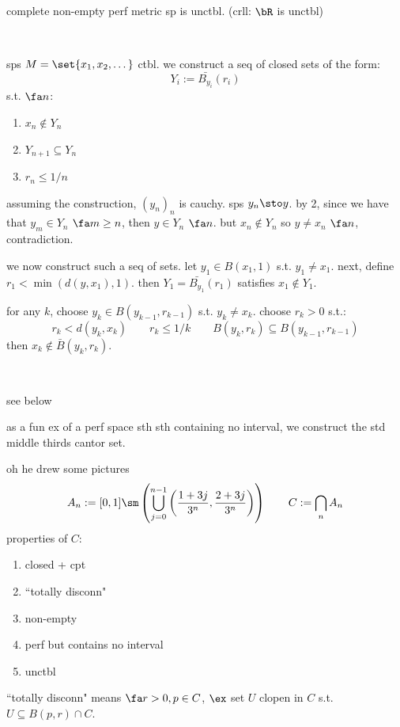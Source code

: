 \begin{thm}
    complete non-empty perf metric sp is unctbl.
	(crll: $\bR$ is unctbl)
\end{thm} \

\begin{pf}[source=Primary Source Material]
    sps $M=\set{x_{1},x_{2},\dots}$ ctbl.
	we construct a seq of closed sets of the form:
	\begin{equation*}
		Y_{i}:=\bar{B_{y_{i}}}(r_{i})
	\end{equation*}
	s.t. $\fa n$:
	\begin{enumerate}
	    \item $x_{n}\notin Y_{n}$
		\item $Y_{n+1}\subseteq Y_{n}$
		\item $r_{n}\leq1/n$
	\end{enumerate}
	assuming the construction, $(y_{n})_{n}$ is cauchy. sps $y_{n}\sto y$.
	by 2, since we have that $y_{m}\in Y_{n}$ $\fa m\geq n$, then
	$y\in Y_{n}$ $\fa n$.
	but $x_{n}\notin Y_{n}$ so $y\neq x_{n}$ $\fa n$, contradiction.

	we now construct such a seq of sets.
	let $y_{1}\in B(x_{1},1)$ s.t. $y_{1}\neq x_{1}$.
	next, define $r_{1}<\min(d(y,x_{1}),1)$.
	then $Y_{1}=\bar{B_{y_{1}}}(r_{1})$ satisfies $x_{1}\notin Y_{1}$.

	for any $k$, choose $y_{k}\in B(y_{k-1},r_{k-1})$ s.t. $y_{k}\neq x_{k}$.
	choose $r_{k}>0$ s.t.:
	\begin{equation*}
	    r_{k}<d(y_{k},x_{k}) \qquad
		r_{k}\leq1/k \qquad
		B(y_{k},r_{k})\subseteq B(y_{k-1},r_{k-1})
	\end{equation*}
	then $x_{k}\notin\bar{B}(y_{k},r_{k})$.
\end{pf} \

\begin{xmp}[title=Cantor Set]
	see below
\end{xmp}
as a fun ex of a perf space sth sth containing no interval,
we construct the std middle thirds cantor set.

oh he drew some pictures
\begin{equation*}
    A_{n}:=[0,1]\sm
	\left(
	\bigcup_{j=0}^{n-1}\left(\frac{1+3j}{3^{n}},\frac{2+3j}{3^{n}}\right)
	\right)
	\qquad
	C:=\bigcap_{n}A_{n}
\end{equation*}
properties of $C$:
\begin{enumerate}
    \item closed + cpt
	\item ``totally disconn"
	\item non-empty
	\item perf but contains no interval
	\item unctbl
\end{enumerate}
``totally disconn" means $\fa r>0, p\in C$, $\ex$ set $U$ clopen in $C$ s.t.
$U\subseteq B(p,r)\cap C$.


